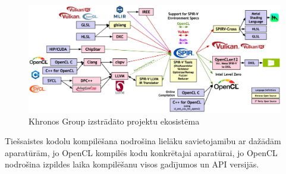 \begin{figure}[H]
    \centering
    \includegraphics[width=\textwidth]{images/2024-spirv-language-ecosystem.jpg}
    \caption{Khronos Group izstrādāto projektu ekosistēma\cite{spirv-ecosystem-image}}
    \label{img:khronos_ecosystem}
\end{figure}

Tiešsaistes kodolu kompilēšana nodrošina lielāku savietojamību ar dažādām
aparatūrām, jo OpenCL kompilēs kodu konkrētajai aparatūrai, jo OpenCL nodrošina
izpildes laika kompilēšanu visos gadījumos un API versijās.
